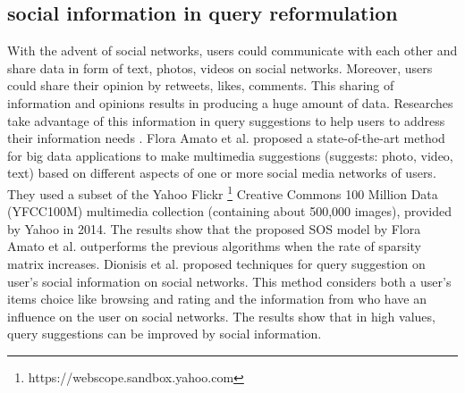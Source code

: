 \documentclass[sigconf]{acmart}
\begin{document}
\subsection{social information in query reformulation}
With the advent of social networks, users could communicate with each other and share data in form of text, photos, videos on social networks. Moreover, users could share their opinion by retweets, likes, comments. This sharing of information and opinions results in producing a huge amount of data. Researches take advantage of this information in query suggestions to help users to address their information needs \cite{konstas2009social, ma2011recommender}. Flora Amato et al. \cite{amato2019sos} proposed a state-of-the-art method for big data applications to make multimedia suggestions (suggests: photo, video, text) based on different aspects of one or more social media networks of users. They used a subset of the Yahoo Flickr \footnote{https://webscope.sandbox.yahoo.com} Creative Commons 100 Million Data (YFCC100M) multimedia collection (containing about 500,000 images), provided by Yahoo in 2014. The results show that the proposed SOS model by Flora Amato et al. \cite{amato2019sos} outperforms the previous algorithms when the rate of sparsity matrix increases. Dionisis et al. \cite{margaris2018query} proposed techniques for query suggestion on user’s social information on social networks. This method considers both a user’s items choice like browsing and rating and the information from who have an influence on the user on social networks. The results show that in high values, query suggestions can be improved by social information.
\vspace{-3pt}
\end{document}
